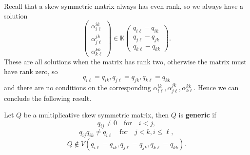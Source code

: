 \documentclass{amsart}
\begin{document}
Recall that a skew symmetric matrix always has even rank, so we always have a solution
$$\begin{pmatrix}
  \alpha^{ik}_{i\ell} \\ \alpha^{jk}_{j\ell} \\  \alpha^{kk}_{k\ell}
\end{pmatrix}
\in \mathbb{K}
\begin{pmatrix}
  q_{i\ell} - q_{ik} \\ q_{j\ell} - q_{jk} \\ q_{k\ell} - q_{kk}
\end{pmatrix}.$$
These are all solutions when the matrix has rank two, otherwise the matrix must have rank zero, so $$ q_{i\ell} = q_{ik},q_{j\ell} = q_{jk}, q_{k\ell} = q_{kk}$$
and there are no conditions on the corresponding  $\alpha^{ik}_{i\ell},\alpha^{jk}_{j\ell},\alpha^{kk}_{k\ell}.$  Hence we can conclude the following result.

\begin{definition}
Let $Q$ be a multiplicative skew symmetric matrix, then $Q$ is {\bf generic} if 
  $$q_{ij} \neq 0 \quad\text{for}\quad i<j,$$
  $$q_{ij}q_{ik} \neq q_{i\ell} \quad \text{for} \quad j<k, i \leq \ell,$$
  $$ Q \notin V(q_{i\ell} = q_{ik},q_{j\ell} = q_{jk}, q_{k\ell} = q_{kk}).$$
\end{definition}
\end{document}
